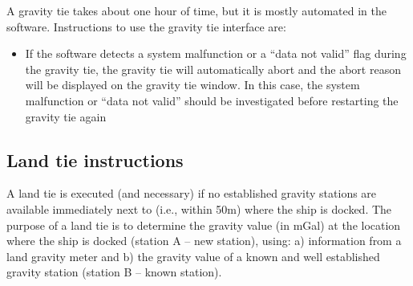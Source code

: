 \documentclass{pfpe-manual}
\begin{document}
A gravity tie takes about one hour of time, but it is mostly automated in the software. Instructions to use the gravity tie interface are:
\begin{itemize}
\item If the software detects a system malfunction or a “data not valid” flag during the gravity tie, the gravity tie will automatically abort and the abort reason will be displayed on the gravity tie window. In this case, the system malfunction or “data not valid” should be investigated before restarting the gravity tie again
\end{itemize}

\subsection{Land tie instructions}
A land tie is executed (and necessary) if no established gravity stations are available immediately next to (i.e., within 50m) where the ship is docked. The purpose of a land tie is to determine the gravity value (in mGal) at the location where the ship is docked (station A – new station), using: a) information from a land gravity meter and b) the gravity value of a known and well established gravity station (station B – known station).
\end{document}

